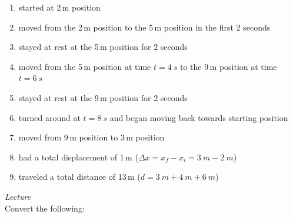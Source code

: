 \documentclass[dvipsnames]{exam}
\begin{document}
\begin{questions}
\begin{center}
\end{center}

\begin{solution}
    \phantom{.}
    \begin{enumerate}
        \item started at 2\,m position
        \item moved from the 2\,m position to the 5\,m position in the first 2 seconds
        \item stayed at rest at the 5\,m position for 2 seconds
        \item moved from the 5\,m position at time $t = \SI{4}{s}$ to the 9\,m position at time $t = \SI{6}{s}$
        \item stayed at rest at the 9\,m position for 2 seconds
        \item turned around at $t = \SI{8}{s}$ and began moving back towards starting position
        \item moved from 9\,m position to 3\,m position
        \item had a total displacement of 1\,m ($\Delta x = x_f - x_i = \SI{3}{m} - \SI{2}{m}$)
        \item traveled a total distance of 13\,m ($d = \SI{3}{m} + \SI{4}{m} + \SI{6}{m}$)

    \end{enumerate}
\end{solution}


\question
\textit{Lecture}\\
Convert the following:

\end{questions}
\end{document}
